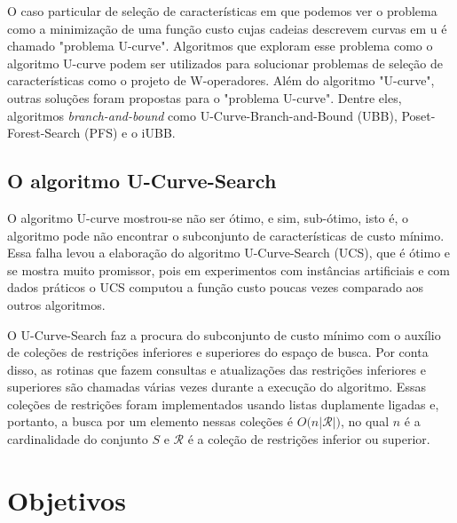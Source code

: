\documentclass[12pt]{article}
\begin{document}
O caso particular de seleção de características em que podemos ver o problema como a minimização de uma função custo cujas cadeias descrevem curvas em u é chamado "problema U-curve". Algoritmos que exploram esse problema como o algoritmo U-curve\cite{u-curve algorithm} podem ser utilizados para solucionar problemas de seleção de características como o projeto de W-operadores. Além do algoritmo "U-curve", outras soluções foram propostas para o "problema U-curve". Dentre eles, algoritmos \emph{branch-and-bound} como U-Curve-Branch-and-Bound (UBB), Poset-Forest-Search (PFS)\cite{msreis thesis} e o iUBB\cite{iubb}.

\subsection{O algoritmo U-Curve-Search}
O algoritmo U-curve mostrou-se não ser ótimo, e sim, sub-ótimo, isto é, o algoritmo pode não encontrar o subconjunto de características de custo mínimo\cite{msreis thesis, ucs paper}. Essa falha levou a elaboração do algoritmo U-Curve-Search (UCS), que é ótimo e se mostra muito promissor, pois em experimentos com instâncias artificiais e com dados práticos o UCS computou a função custo poucas vezes comparado aos outros algoritmos\cite{msreis thesis, ucs paper, math morph paper}.

O U-Curve-Search faz a procura do subconjunto de custo mínimo com o auxílio de coleções de restrições inferiores e superiores do espaço de busca. Por conta disso, as rotinas que fazem consultas e atualizações das restrições inferiores e superiores são chamadas várias vezes durante a execução do algoritmo. Essas coleções de restrições foram implementados usando listas duplamente ligadas e, portanto, a busca por um elemento nessas coleções é \begin{math}O(n|\end{math}$\mathcal{R}$\begin{math}|)\end{math}, no qual \begin{math}n\end{math} é a cardinalidade do conjunto \begin{math}S\end{math} e $\mathcal{R}$ é a coleção de restrições inferior ou superior.



\section{Objetivos}
\end{document}
